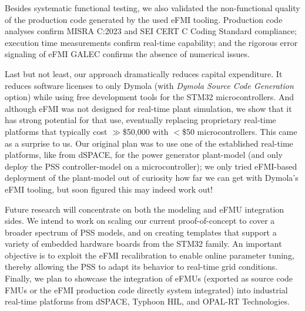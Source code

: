Besides systematic functional testing, we also validated the non-functional quality of the production code generated by the used eFMI tooling. Production code analyses confirm MISRA C:2023 and SEI CERT C Coding Standard compliance; execution time measurements confirm real-time capability; and the rigorous error signaling of eFMI GALEC confirms the absence of numerical issues.

Last but not least, our approach dramatically reduces capital expenditure. It reduces software licenses to only Dymola (with \textit{Dymola Source Code Generation} option) while using free development tools for the STM32 microcontrollers. And although eFMI was not designed for real-time plant simulation, we show that it has strong potential for that use, eventually replacing proprietary real-time platforms that typically cost $\gg$\$50,000 with $<$\$50 microcontrollers. This came as a surprise to us. Our original plan was to use one of the established real-time platforms, like from dSPACE, for the power generator plant-model (and only deploy the PSS controller-model on a microcontroller); we only tried eFMI-based deployment of the plant-model out of curiosity how far we can get with Dymola's eFMI tooling, but soon figured this may indeed work out!

Future research will concentrate on both the modeling and eFMU integration sides. We intend to work on scaling our current proof-of-concept to cover a broader spectrum of PSS models, and on creating templates that support a variety of embedded hardware boards from the STM32 family. An important objective is to exploit the eFMI recalibration to enable online parameter tuning, thereby allowing the PSS to adapt its behavior to real-time grid conditions. Finally, we plan to showcase the integration of eFMUs (exported as source code FMUs or the eFMI production code directly system integrated) into industrial real-time platforms from dSPACE, Typhoon HIL, and OPAL-RT Technologies.
